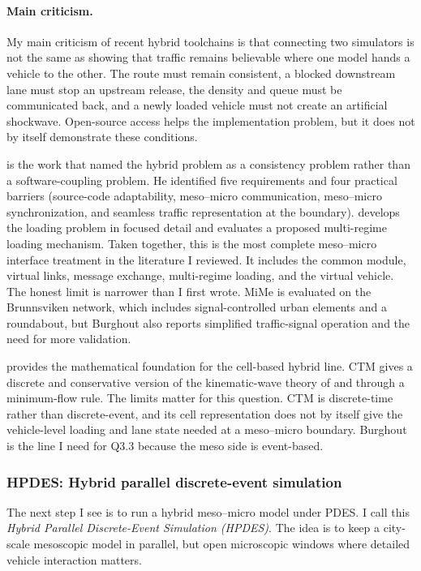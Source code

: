 \begin{bibunit}[plainnat]
\paragraph*{Main criticism.}
My main criticism of recent hybrid toolchains is that connecting two simulators is not the same as showing that traffic remains believable where one model hands a vehicle to the other. The route must remain consistent, a blocked downstream lane must stop an upstream release, the density and queue must be communicated back, and a newly loaded vehicle must not create an artificial shockwave. Open-source access helps the implementation problem, but it does not by itself demonstrate these conditions.

\citet{burghout2004thesis} is the work that named the hybrid problem as a consistency problem rather than a software-coupling problem. He identified five requirements and four practical barriers (source-code adaptability, meso--micro communication, meso--micro synchronization, and seamless traffic representation at the boundary). \citet{burghout2006loading} develops the loading problem in focused detail and evaluates a proposed multi-regime loading mechanism. Taken together, this is the most complete meso--micro interface treatment in the literature I reviewed. It includes the common module, virtual links, message exchange, multi-regime loading, and the virtual vehicle. The honest limit is narrower than I first wrote. MiMe is evaluated on the Brunnsviken network, which includes signal-controlled urban elements and a roundabout, but Burghout also reports simplified traffic-signal operation and the need for more validation.

\citet{daganzo1994ctm} provides the mathematical foundation for the cell-based hybrid line. CTM gives a discrete and conservative version of the kinematic-wave theory of \citet{lighthill1955kinematic} and \citet{richards1956shock} through a minimum-flow rule. The limits matter for this question. CTM is discrete-time rather than discrete-event, and its cell representation does not by itself give the vehicle-level loading and lane state needed at a meso--micro boundary. Burghout is the line I need for Q3.3 because the meso side is event-based.

\subsubsection{HPDES: Hybrid parallel discrete-event simulation}

The next step I see is to run a hybrid meso--micro model under PDES. I call
this \textit{Hybrid Parallel Discrete-Event Simulation (HPDES)}. The idea is
to keep a city-scale mesoscopic model in parallel, but open microscopic
windows where detailed vehicle interaction matters.


\end{bibunit}
